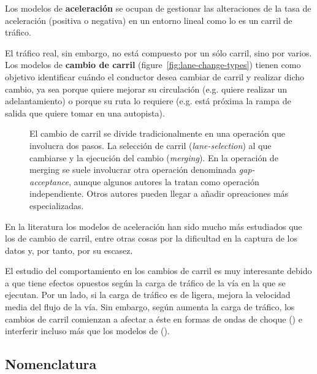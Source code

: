 Los modelos de \textbf{aceleración} se ocupan de gestionar las alteraciones de la tasa de aceleración (positiva o negativa) en un entorno lineal como lo es un carril de tráfico.

El tráfico real, sin embargo, no está compuesto por un sólo carril, sino por varios. Los modelos de \textbf{cambio de carril} (figure~\ref{fig:lane-change-types}) tienen como objetivo identificar cuándo el conductor desea cambiar de carril y realizar dicho cambio, ya sea porque quiere mejorar su circulación (e.g. quiere realizar un adelantamiento) o porque su ruta lo requiere (e.g. está próxima la rampa de salida que quiere tomar en una autopista).

\begin{figure}
	\centering
	\caption{El cambio de carril se divide tradicionalmente en una operación que involucra dos pasos. La selección de carril (\textit{lane-selection}) al que cambiarse y la ejecución del cambio (\textit{merging}). En la operación de merging se suele involucrar otra operación denominada \textit{gap-acceptance}, aunque algunos autores la tratan como operación independiente. Otros autores pueden llegar a añadir opreaciones más especializadas.}
	\label{fig:lane-selection-plus-merging}
\end{figure}

En la literatura los modelos de aceleración han sido mucho más estudiados que los de cambio de carril, entre otras cosas por la dificultad en la captura de los datos y, por tanto, por su escasez.

El estudio del comportamiento en los cambios de carril es muy interesante debido a que tiene efectos opuestos según la carga de tráfico de la vía en la que se ejecutan. Por un lado, si la carga de tráfico es de ligera, mejora la velocidad media del flujo de la vía. Sin embargo, según aumenta la carga de tráfico, los cambios de carril comienzan a afectar a éste en formas de ondas de choque (\cite{Sasoh2002, Jin2006}) e interferir incluso más que los modelos de \textit{} (\cite{Laval2006}).

\subsection{Nomenclatura}

